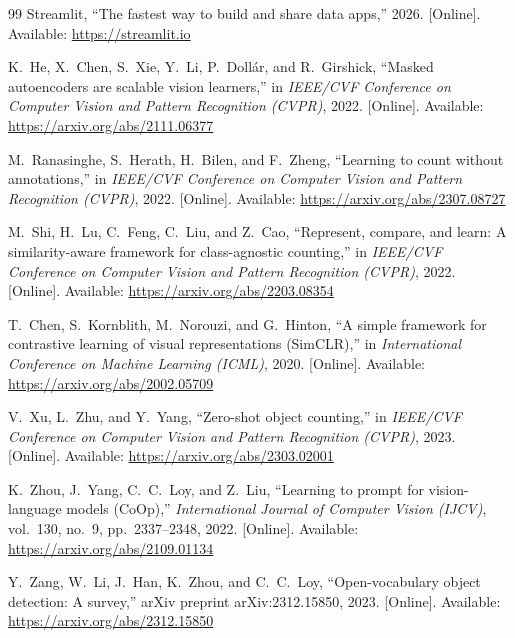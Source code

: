 \documentclass[a4paper,12pt]{report}
\numberwithin{figure}{chapter}
\numberwithin{table}{chapter}
\begin{document}
\begin{thebibliography}{99}
Streamlit, ``The fastest way to build and share data apps,'' 2026.
[Online]. Available: \url{https://streamlit.io}

K.~He, X.~Chen, S.~Xie, Y.~Li, P.~Doll{\'a}r, and R.~Girshick,
``Masked autoencoders are scalable vision learners,''
in \emph{IEEE/CVF Conference on Computer Vision and Pattern
Recognition (CVPR)}, 2022.
[Online]. Available:
\url{https://arxiv.org/abs/2111.06377}

M.~Ranasinghe, S.~Herath, H.~Bilen, and F.~Zheng,
``Learning to count without annotations,''
in \emph{IEEE/CVF Conference on Computer Vision and Pattern
Recognition (CVPR)}, 2022.
[Online]. Available:
\url{https://arxiv.org/abs/2307.08727}

M.~Shi, H.~Lu, C.~Feng, C.~Liu, and Z.~Cao,
``Represent, compare, and learn: A similarity-aware framework
for class-agnostic counting,''
in \emph{IEEE/CVF Conference on Computer Vision and Pattern
Recognition (CVPR)}, 2022.
[Online]. Available:
\url{https://arxiv.org/abs/2203.08354}

T.~Chen, S.~Kornblith, M.~Norouzi, and G.~Hinton,
``A simple framework for contrastive learning of visual
representations (SimCLR),''
in \emph{International Conference on Machine Learning (ICML)}, 2020.
[Online]. Available:
\url{https://arxiv.org/abs/2002.05709}

V.~Xu, L.~Zhu, and Y.~Yang,
``Zero-shot object counting,''
in \emph{IEEE/CVF Conference on Computer Vision and Pattern
Recognition (CVPR)}, 2023.
[Online]. Available:
\url{https://arxiv.org/abs/2303.02001}

K.~Zhou, J.~Yang, C.~C.~Loy, and Z.~Liu,
``Learning to prompt for vision-language models (CoOp),''
\emph{International Journal of Computer Vision (IJCV)}, vol.~130,
no.~9, pp.~2337--2348, 2022.
[Online]. Available:
\url{https://arxiv.org/abs/2109.01134}

Y.~Zang, W.~Li, J.~Han, K.~Zhou, and C.~C.~Loy,
``Open-vocabulary object detection: A survey,''
arXiv preprint arXiv:2312.15850, 2023.
[Online]. Available:
\url{https://arxiv.org/abs/2312.15850}

\end{thebibliography}
\end{document}
